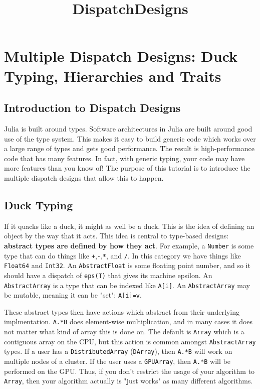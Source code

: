\documentclass[11pt]{article}
\title{DispatchDesigns}
\begin{document}
    
    
    \maketitle
    
    

    
    \section{Multiple Dispatch Designs: Duck Typing, Hierarchies and
Traits}\label{multiple-dispatch-designs-duck-typing-hierarchies-and-traits}

\subsection{Introduction to Dispatch
Designs}\label{introduction-to-dispatch-designs}

Julia is built around types. Software architectures in Julia are built
around good use of the type system. This makes it easy to build generic
code which works over a large range of types and gets good performance.
The result is high-performance code that has many features. In fact,
with generic typing, your code may have more features than you know of!
The purpose of this tutorial is to introduce the multiple dispatch
designs that allow this to happen.

    \subsection{Duck Typing}\label{duck-typing}

If it quacks like a duck, it might as well be a duck. This is the idea
of defining an object by the way that it acts. This idea is central to
type-based designs: \textbf{abstract types are defined by how they act}.
For example, a \texttt{Number} is some type that can do things like
\texttt{+},\texttt{-},\texttt{*}, and \texttt{/}. In this category we
have things like \texttt{Float64} and \texttt{Int32}. An
\texttt{AbstractFloat} is some floating point number, and so it should
have a dispatch of \texttt{eps(T)} that gives its machine epsilon. An
\texttt{AbstractArray} is a type that can be indexed like
\texttt{A{[}i{]}}. An \texttt{AbstractArray} may be mutable, meaning it
can be "set": \texttt{A{[}i{]}=v}.

These abstract types then have actions which abstract from their
underlying implmentation. \texttt{A.*B} does element-wise
multiplication, and in many cases it does not matter what kind of array
this is done on. The default is \texttt{Array} which is a contiguous
array on the CPU, but this action is common amongst
\texttt{AbstractArray} types. If a user has a \texttt{DistributedArray}
(\texttt{DArray}), then \texttt{A.*B} will work on multiple nodes of a
cluster. If the user uses a \texttt{GPUArray}, then \texttt{A.*B} will
be performed on the GPU. Thus, if you don't restrict the usage of your
algorithm to \texttt{Array}, then your algorithm actually is "just
works" as many different algorithms.
\end{document}
